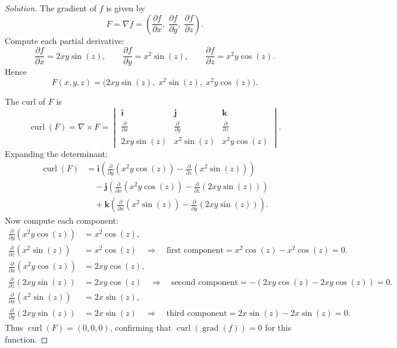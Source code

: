 \documentclass[12pt, a4paper]{article}
\theoremstyle{definition}
\newenvironment{solution}
  {\renewcommand\qedsymbol{$\blacksquare$}\begin{proof}[Solution]}
  {\end{proof}}
\begin{document}
\begin{solution}
\item[(a)] The gradient of \( f \) is given by
\[
F = \nabla f = \left( \frac{\partial f}{\partial x},\; \frac{\partial f}{\partial y},\; \frac{\partial f}{\partial z} \right).
\]
Compute each partial derivative:
\[
\frac{\partial f}{\partial x} = 2xy \sin(z), \qquad
\frac{\partial f}{\partial y} = x^2 \sin(z), \qquad
\frac{\partial f}{\partial z} = x^2 y \cos(z).
\]
Hence
\[
F(x,y,z) = \bigl( 2xy \sin(z),\; x^2 \sin(z),\; x^2 y \cos(z) \bigr).
\]

\item[(b)] The curl of \( F \) is
\[
\operatorname{curl}(F) = \nabla \times F = 
\begin{vmatrix}
\mathbf{i} & \mathbf{j} & \mathbf{k} \\
\frac{\partial}{\partial x} & \frac{\partial}{\partial y} & \frac{\partial}{\partial z} \\
2xy \sin(z) & x^2 \sin(z) & x^2 y \cos(z)
\end{vmatrix}.
\]
Expanding the determinant:
\[
\begin{aligned}
\operatorname{curl}(F) &= \mathbf{i} \left( \frac{\partial}{\partial y}(x^2 y \cos(z)) - \frac{\partial}{\partial z}(x^2 \sin(z)) \right) \\
&\quad - \mathbf{j} \left( \frac{\partial}{\partial x}(x^2 y \cos(z)) - \frac{\partial}{\partial z}(2xy \sin(z)) \right) \\
&\quad + \mathbf{k} \left( \frac{\partial}{\partial x}(x^2 \sin(z)) - \frac{\partial}{\partial y}(2xy \sin(z)) \right).
\end{aligned}
\]
Now compute each component:
\[
\begin{aligned}
\frac{\partial}{\partial y}(x^2 y \cos(z)) &= x^2 \cos(z), \\
\frac{\partial}{\partial z}(x^2 \sin(z)) &= x^2 \cos(z) \quad \Rightarrow \quad \text{first component} = x^2 \cos(z) - x^2 \cos(z) = 0. \\[4pt]
\frac{\partial}{\partial x}(x^2 y \cos(z)) &= 2xy \cos(z), \\
\frac{\partial}{\partial z}(2xy \sin(z)) &= 2xy \cos(z) \quad \Rightarrow \quad \text{second component} = -(2xy \cos(z) - 2xy \cos(z)) = 0. \\[4pt]
\frac{\partial}{\partial x}(x^2 \sin(z)) &= 2x \sin(z), \\
\frac{\partial}{\partial y}(2xy \sin(z)) &= 2x \sin(z) \quad \Rightarrow \quad \text{third component} = 2x \sin(z) - 2x \sin(z) = 0.
\end{aligned}
\]
Thus \(\operatorname{curl}(F) = (0,0,0)\), confirming that \(\operatorname{curl}(\operatorname{grad}(f)) = 0\) for this function.
\end{solution}
\end{document}
